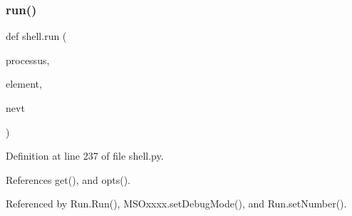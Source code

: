 \subsubsection{\texorpdfstring{run()}{run()}}
{\footnotesize\ttfamily def shell.\+run (\begin{DoxyParamCaption}\item[{}]{processus,  }\item[{}]{element,  }\item[{}]{nevt }\end{DoxyParamCaption})}



Definition at line 237 of file shell.\+py.



References get(), and opts().



Referenced by Run.\+Run(), M\+S\+Oxxxx.\+set\+Debug\+Mode(), and Run.\+set\+Number().


